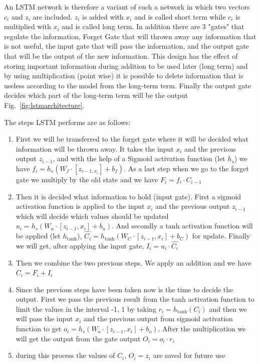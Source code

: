 \documentclass[a4paper,12pt]{report}
\theoremstyle{definitionNODot}
\begin{document}
\begin{itemize}
		An LSTM network is therefore a variant of such a network \cite{LSTM1997HochreiterSchmidhuber} in which two vectors $c_i$ and $z_i$ are included. $z_i$ is added with $x_i$ and is called short term while $c_i$ is multiplied with $x_i$ and is called long term. In addition there are 3 "gates" that regulate the information,  Forget Gate that will thrown away any information that is not useful, the input gate that will pass the information, and the output gate that will be the output of the new information. This design has the effect of storing important information during addition to be used later (long term) and by using multiplication (point wise) it is possible to delete information that is useless according to the model from the long-term term. Finally the output gate decides which part of the long-term term will be the output Fig.~\ref{fig:lstmarchitecture}.
		
		The steps LSTM performs are as follows:
		
		\begin{enumerate}
			\item First we will be transferred to the forget gate where it will be decided what information will be thrown away. It takes the input $x_i$ and the previous output $z_{i-1}$, and with the help of a Sigmoid activation function (let $h_s$) we have $f_i = h_s(W_f\cdot [ z_{i-1, x_i}] + b_f)$. As a last step when we go to the forget gate we multiply by the old state and we have $F_i = f_i \cdot C_{i-1}$
			\item Then it is decided what information to hold (input gate). First a sigmoid activation function is applied to the input $x_i$ and the previous output $z_{i-1}$ which will decide which values should be updated $u_i = h_s(W_u \cdot [z_{i-1}, x_i] + b_u)$. And secondly a tanh activation function will be applied (let $h_\text{tanh}$), $\hat{C_i} = h_\text{tanh}(W_C \cdot [z_{i-1}, x_i] + b_C) $ for update. Finally we will get, after applying the input gate, $I_i = u_i \cdot \hat{C_i}$
			\item Then we combine the two previous steps. We apply an addition and we have $ C_i = F_i + I_i$
			\item Since the previous steps have been taken now is the time to decide the output. First we pass the previous result from the tanh activation function to limit the values in the interval -1, 1 by taking $r_i = h_\text{tanh}(C_i)$ and then we will pass the input $x_i$ and the previous output from sigmoid activation function to get $o_i = h_s(W_o \cdot [z_{i-1}, x_i] + b_o)$. After the multiplication we will get the output from the gate output $O_i = o_i \cdot r_i$
			\item during this process the values of $C_i$, $O_i=z_i$ are saved for future use
		\end{enumerate}
		

\end{itemize}
\end{document}
